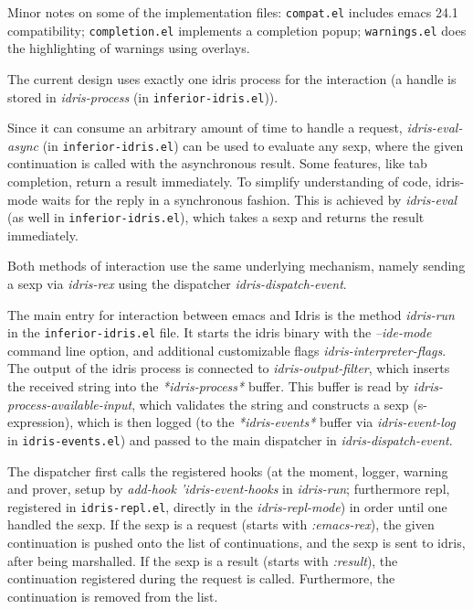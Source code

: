 \documentclass{article}
\begin{document}
Minor notes on some of the implementation files: \texttt{compat.el} includes emacs 24.1 compatibility; \texttt{completion.el} implements a completion popup; \texttt{warnings.el} does the highlighting of warnings using overlays.

The current design uses exactly one idris process for the interaction (a handle is stored in \emph{idris-process} (in \texttt{inferior-idris.el})).

Since it can consume an arbitrary amount of time to handle a request, \emph{idris-eval-async} (in \texttt{inferior-idris.el}) can be used to evaluate any sexp, where the given continuation is called with the asynchronous result.
Some features, like tab completion, return a result immediately.
To simplify understanding of code, idris-mode waits for the reply in a synchronous fashion.
This is achieved by \emph{idris-eval} (as well in \texttt{inferior-idris.el}), which takes a sexp and returns the result immediately.

Both methods of interaction use the same underlying mechanism, namely sending a sexp via \emph{idris-rex} using the dispatcher \emph{idris-dispatch-event}.

The main entry for interaction between emacs and Idris is the method \emph{idris-run} in the \texttt{inferior-idris.el} file.
It starts the idris binary with the \emph{--ide-mode} command line option, and additional customizable flags \emph{idris-interpreter-flags}.
The output of the idris process is connected to \emph{idris-output-filter}, which inserts the received string into the \emph{*idris-process*} buffer.
This buffer is read by \emph{idris-process-available-input}, which validates the string and constructs a sexp (s-expression), which is then logged (to the \emph{*idris-events*} buffer via \emph{idris-event-log} in \texttt{idris-events.el}) and passed to the main dispatcher in \emph{idris-dispatch-event}.

The dispatcher first calls the registered hooks (at the moment, logger, warning and prover, setup by \emph{add-hook 'idris-event-hooks} in \emph{idris-run}; furthermore repl, registered in \texttt{idris-repl.el}, directly in the \emph{idris-repl-mode}) in order until one handled the sexp.
If the sexp is a request (starts with \emph{:emacs-rex}), the given continuation is pushed onto the list of continuations, and the sexp is sent to idris, after being marshalled.
If the sexp is a result (starts with \emph{:result}), the continuation registered during the request is called.
Furthermore, the continuation is removed from the list.
\end{document}
